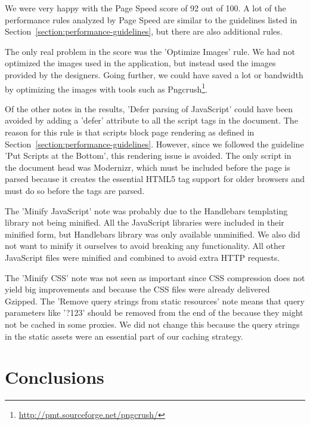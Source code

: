 We were very happy with the Page Speed score of 92 out of 100. A lot
of the performance rules analyzed by Page Speed are similar to the
guidelines listed in Section~\ref{section:performance-guidelines}, but
there are also additional rules.

The only real problem in the score was the 'Optimize Images' rule. We
had not optimized the images used in the application, but instead used
the images provided by the designers. Going further, we could have
saved a lot or bandwidth by optimizing the images with tools such as
Pngcrush\footnote{\url{http://pmt.sourceforge.net/pngcrush/}}.

Of the other notes in the results, 'Defer parsing of JavaScript' could
have been avoided by adding a 'defer' attribute to all the script tags
in the document. The reason for this rule is that scripts block page
rendering as defined in
Section~\ref{section:performance-guidelines}. However, since we
followed the guideline 'Put Scripts at the Bottom', this rendering
issue is avoided. The only script in the document head was Modernizr,
which must be included before the page is parsed because it creates
the essential HTML5 tag support for older browsers and must do so
before the tags are parsed.

The 'Minify JavaScript' note was probably due to the Handlebars
templating library not being minified. All the JavaScript libraries
were included in their minified form, but Handlebars library was only
available unminified. We also did not want to minify it ourselves to
avoid breaking any functionality. All other JavaScript files were
minified and combined to avoid extra HTTP requests.

The 'Minify CSS' note was not seen as important since CSS compression
does not yield big improvements and because the CSS files were already
delivered Gzipped. The 'Remove query strings from static resources'
note means that query parameters like '?123' should be removed from
the end of the  because they might not be cached in some
proxies. We did not change this because the query strings in the
static assets were an essential part of our caching strategy.

\section{Conclusions}

